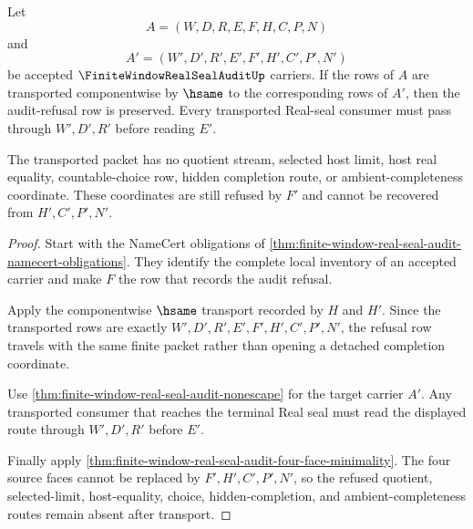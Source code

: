 \begin{theorem}
\label{thm:finite-window-real-seal-audit-refusal-transport}
Let
$$
A=(W,D,R,E,F,H,C,P,N)
$$
and
$$
A'=(W',D',R',E',F',H',C',P',N')
$$
be accepted $\FiniteWindowRealSealAuditUp$ carriers. If the rows of $A$ are transported componentwise by $\hsame$ to the corresponding rows of $A'$, then the audit-refusal row is preserved. Every transported Real-seal consumer must pass through $W',D',R'$ before reading $E'$.

The transported packet has no quotient stream, selected host limit, host real equality, countable-choice row, hidden completion route, or ambient-completeness coordinate. These coordinates are still refused by $F'$ and cannot be recovered from $H',C',P',N'$.
\end{theorem}
\begin{proof}
Start with the NameCert obligations of \autoref{thm:finite-window-real-seal-audit-namecert-obligations}. They identify the complete local inventory of an accepted carrier and make $F$ the row that records the audit refusal.

Apply the componentwise $\hsame$ transport recorded by $H$ and $H'$. Since the transported rows are exactly $W',D',R',E',F',H',C',P',N'$, the refusal row travels with the same finite packet rather than opening a detached completion coordinate.

Use \autoref{thm:finite-window-real-seal-audit-nonescape} for the target carrier $A'$. Any transported consumer that reaches the terminal Real seal must read the displayed route through $W',D',R'$ before $E'$.

Finally apply \autoref{thm:finite-window-real-seal-audit-four-face-minimality}. The four source faces cannot be replaced by $F',H',C',P',N'$, so the refused quotient, selected-limit, host-equality, choice, hidden-completion, and ambient-completeness routes remain absent after transport.
\end{proof}

